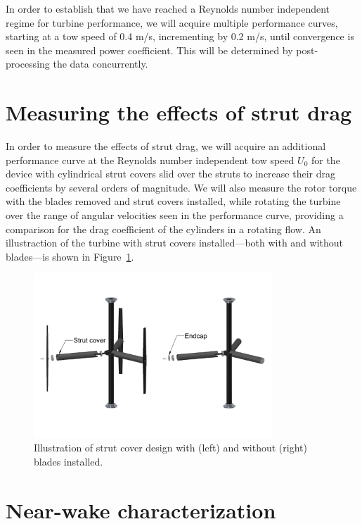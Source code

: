 \documentclass[12pt,letterpaper]{scrreprt}
\begin{document}
In order to establish that we have reached a Reynolds number independent regime
for turbine performance, we will acquire multiple performance curves, starting
at a tow speed of 0.4 m/s, incrementing by 0.2 m/s, until
convergence is seen in the measured power coefficient. This will be determined
by post-processing the data concurrently.


\section{Measuring the effects of strut drag}

In order to measure the effects of strut drag, we will acquire an additional
performance curve at the Reynolds number independent tow speed $U_0$ for the
device with cylindrical strut covers slid over the struts to increase their drag
coefficients by several orders of magnitude. We will also measure the rotor
torque with the blades removed and strut covers installed, while rotating the
turbine over the range of angular velocities seen in the performance curve,
providing a comparison for the drag coefficient of the cylinders in a rotating
flow. An illustraction of the turbine with strut covers installed---both with
and without blades---is shown in Figure~\ref{fig-strut_covers}.

\begin{figure}[!ht]
\centering
\includegraphics[width=0.8\textwidth]{Figures/strut_covers}
\caption{Illustration of strut cover design with (left) and without (right)
blades installed.}
\label{fig-strut_covers}
\end{figure}

\section{Near-wake characterization}
\end{document}
